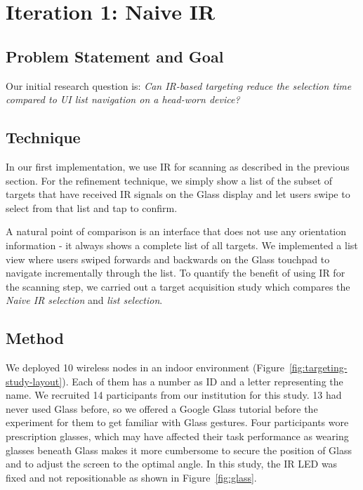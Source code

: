 
\section{Iteration 1: Naive IR}
\subsection{Problem Statement and Goal}
Our initial research question is: {\em Can IR-based targeting reduce the selection time compared to UI list navigation on a head-worn device?} 

\subsection{Technique}
In our first implementation, we use IR for scanning as described in the previous section. For the refinement technique, we simply show a list of the subset of targets that have received IR signals on the Glass display and let users swipe to select from that list and tap to confirm.

A natural point of comparison is an interface that does not use any orientation information - it always shows 
a complete list of all targets. We implemented a list view where users swiped forwards and backwards on the Glass touchpad to navigate incrementally through the list. To quantify the benefit of using IR for the scanning step, we carried out a target acquisition study which compares the {\em Naive IR selection} and {\em list selection}.  

\subsection{Method}
We deployed 10 wireless nodes in an indoor environment (Figure~\ref{fig:targeting-study-layout}). Each of them has a number as ID and a letter representing the name. We recruited 14 participants from our institution for this study. 13 had never used Glass before, so we offered a Google Glass tutorial before the experiment for them to get familiar with Glass gestures. Four participants wore prescription glasses, which may have affected their task performance as wearing glasses beneath Glass makes it more cumbersome to secure the position of Glass and to adjust the screen to the optimal angle. In this study, the IR LED was fixed and not repositionable as shown in Figure~\ref{fig:glass}.

